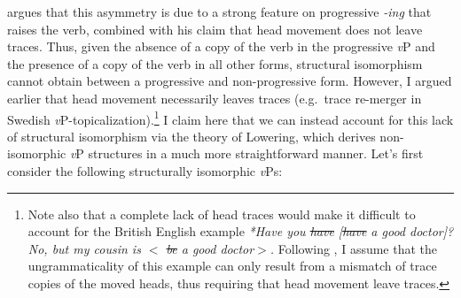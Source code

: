 \citet{omaki2008} argues that this asymmetry is due to a strong feature on progressive {\it -ing} that raises the verb, combined with his claim that head movement does not leave traces. Thus, given the absence of a copy of the verb in the progressive {\it v}P and the presence of a copy of the verb in all other forms, structural isomorphism cannot obtain between a progressive and non-progressive form. However, I argued earlier that head movement necessarily leaves traces (e.g.\ trace re-merger in Swedish {\it v}P-topicalization).\footnote{Note also that a complete lack of head traces would make it difficult to account for the British English example \textit{*Have you \sout{have} [\sout{have} a good doctor]? No, but my cousin is $<$ \sout{be} a good doctor$>$.} Following \citet{potsdam1997}, I assume that the ungrammaticality of this example can only result from a mismatch of trace copies of the moved heads, thus requiring that head movement leave traces.} I claim here that we can instead account for this lack of structural isomorphism via the theory of Lowering, which derives non-isomorphic {\it v}P structures in a much more straightforward manner. Let's first consider the following structurally isomorphic {\it v}Ps:\\

